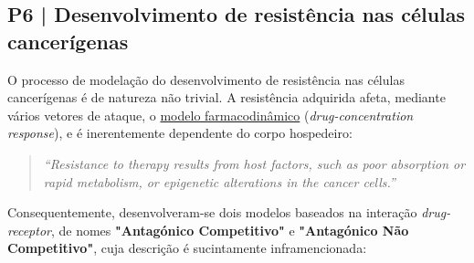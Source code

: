 \clearpage
\vspace{-1em}
\subsection{P6 | Desenvolvimento de resistência nas células cancerígenas}
\label{subsec:P6}

O processo de modelação do desenvolvimento de resistência nas células cancerígenas é de natureza não trivial. A resistência adquirida afeta, mediante vários vetores de ataque, o \hyperref[subsec:P2]{modelo farmacodinâmico} (\textit{drug-concentration response}), e é inerentemente dependente do corpo hospedeiro:

\begin{quote}
    \textit{``Resistance to therapy results from host factors, such as poor
    absorption or rapid metabolism, or epigenetic alterations in the cancer cells.''}\cite{teles_2017}
\end{quote}

Consequentemente, desenvolveram-se dois modelos baseados na interação \textit{drug-receptor}, de nomes \textbf{"Antagónico Competitivo"} e \textbf{"Antagónico Não Competitivo"}, cuja descrição é sucintamente inframencionada:

